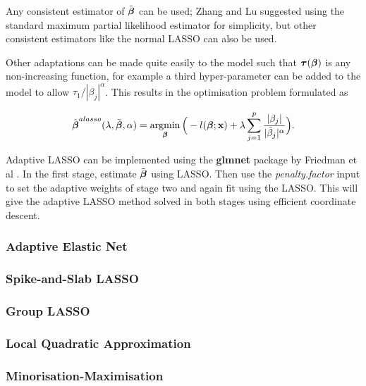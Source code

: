 Any consistent estimator of $\Tilde{\boldsymbol{\beta}}$ can be used; Zhang and Lu  suggested using the standard maximum partial likelihood estimator for simplicity, but other consistent estimators like the normal LASSO can also be used.

Other adaptations can be made quite easily to the model such that $\boldsymbol{\tau}(\boldsymbol{\beta})$ is any non-increasing function, for example a third hyper-parameter can be added to the model to allow $\tau_1/|\beta_j|^\alpha$. This results in the optimisation problem formulated as 

\begin{equation}\label{eqn:adaptive-lasso-triple}
    \hat{\boldsymbol{\beta}}^{alasso}(\lambda,\Tilde{\boldsymbol{\beta}},\alpha)=\operatorname*{argmin}_{\boldsymbol{\beta}}\Big(-l(\boldsymbol{\beta};\textbf{x})+\lambda\sum_{j=1}^p\frac{|\beta_j|}{|\Tilde{\beta}_j|^\alpha}\Big).
\end{equation}

Adaptive LASSO can be implemented using the \textbf{glmnet} package by Friedman et al . In the first stage, estimate $\Tilde{\boldsymbol{\beta}}$ using LASSO. Then use the \emph{penalty.factor} input to set the adaptive weights of stage two and again fit using the LASSO. This will give the adaptive LASSO method solved in both stages using efficient coordinate descent.

\iffalse
\subsubsection{Adaptive Elastic Net}

\subsubsection{Spike-and-Slab LASSO}
\subsubsection{Group LASSO}


\subsubsection{Local Quadratic Approximation}
\subsubsection{Minorisation-Maximisation}
